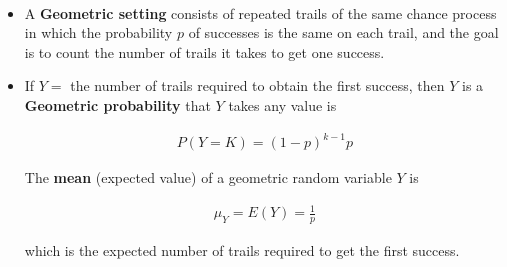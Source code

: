 \documentclass[Main.tex]{subfiles}
\begin{document}
	\begin{example} \hfill \\
		\begin{itemize}	
			\item A \textbf{Geometric setting} consists of repeated trails of the same chance process in which the probability $p$ of successes is the same on each trail, and the goal is to count the number of trails it takes to get one success.\hfill \\
			\item If $Y=$ the number of trails required to obtain the first success, then $Y$ is a \textbf{Geometric probability} that $Y$ takes any value is
			\begin{definition}\hfill
				\begin{subequations}
					\begin{align}
					P(Y=K)=(1-p)^{k-1}p
					\end{align}
				\end{subequations}\hfill	
			\end{definition}
			The \textbf{mean} (expected value) of a geometric random variable $Y$ is
			\begin{definition}\hfill
				\begin{subequations}
					\begin{align}
					\mu_{Y}=E(Y)=\frac{1}{p}
					\end{align}
				\end{subequations}\hfill	
			\end{definition}
			which is the expected number of trails required to get the first success.						
		\end{itemize}
	\end{example}															
\end{document}
